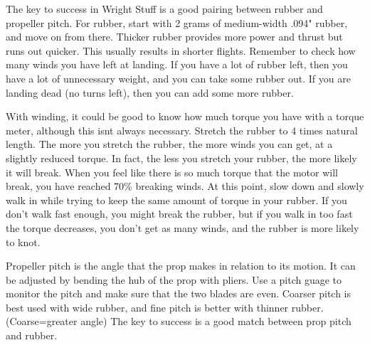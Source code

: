 \documentclass[twocolumn]{article}
\begin{document}
The key to success in Wright Stuff is a good pairing between rubber and propeller pitch. For rubber, start with 2 grams of medium-width .094" rubber, and move on from there. Thicker rubber provides more power and thrust but runs out quicker. This usually results in shorter flights. Remember to check how many winds you have left at landing. If you have a lot of rubber left, then you have a lot of unnecessary weight, and you can take some rubber out. If you are landing dead (no turns left), then you can add some more rubber. 

With winding, it could be good to know how much torque you have with a torque meter, although this isnt always necessary. Stretch the rubber to 4 times natural length. The more you stretch the rubber, the more winds you can get, at a slightly reduced torque. In fact, the less you stretch your rubber, the more likely it will break. When you feel like there is so much torque that the motor will break, you have reached 70\% breaking winds. At this point, slow down and slowly walk in while trying to keep the same amount of torque in your rubber. If you don't walk fast enough, you might break the rubber, but if you walk in too fast the torque decreases, you don't get as many winds, and the rubber is more likely to knot. 

Propeller pitch is the angle that the prop makes in relation to its motion. It can be adjusted by bending the hub of the prop with pliers. Use a pitch guage to monitor the pitch and make sure that the two blades are even. Coarser pitch is best used with wide rubber, and fine pitch is better with thinner rubber. (Coarse=greater angle) The key to success is a good match between prop pitch and rubber. 
\end{document}
